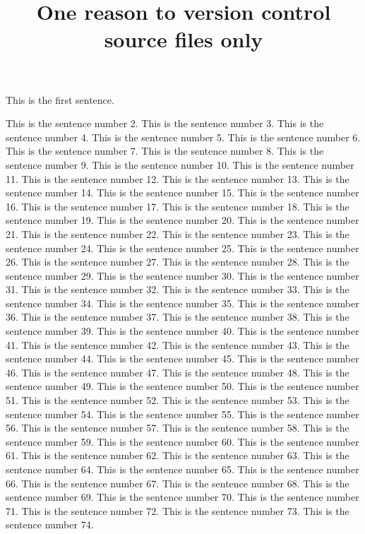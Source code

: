 \documentclass{article}
\title{One reason to version control source files only}
\begin{document}
\maketitle

This is the first sentence.

This is the sentence number 2.
This is the sentence number 3.
This is the sentence number 4.
This is the sentence number 5.
This is the sentence number 6.
This is the sentence number 7.
This is the sentence number 8.
This is the sentence number 9.
This is the sentence number 10.
This is the sentence number 11.
This is the sentence number 12.
This is the sentence number 13.
This is the sentence number 14.
This is the sentence number 15.
This is the sentence number 16.
This is the sentence number 17.
This is the sentence number 18.
This is the sentence number 19.
This is the sentence number 20.
This is the sentence number 21.
This is the sentence number 22.
This is the sentence number 23.
This is the sentence number 24.
This is the sentence number 25.
This is the sentence number 26.
This is the sentence number 27.
This is the sentence number 28.
This is the sentence number 29.
This is the sentence number 30.
This is the sentence number 31.
This is the sentence number 32.
This is the sentence number 33.
This is the sentence number 34.
This is the sentence number 35.
This is the sentence number 36.
This is the sentence number 37.
This is the sentence number 38.
This is the sentence number 39.
This is the sentence number 40.
This is the sentence number 41.
This is the sentence number 42.
This is the sentence number 43.
This is the sentence number 44.
This is the sentence number 45.
This is the sentence number 46.
This is the sentence number 47.
This is the sentence number 48.
This is the sentence number 49.
This is the sentence number 50.
This is the sentence number 51.
This is the sentence number 52.
This is the sentence number 53.
This is the sentence number 54.
This is the sentence number 55.
This is the sentence number 56.
This is the sentence number 57.
This is the sentence number 58.
This is the sentence number 59.
This is the sentence number 60.
This is the sentence number 61.
This is the sentence number 62.
This is the sentence number 63.
This is the sentence number 64.
This is the sentence number 65.
This is the sentence number 66.
This is the sentence number 67.
This is the sentence number 68.
This is the sentence number 69.
This is the sentence number 70.
This is the sentence number 71.
This is the sentence number 72.
This is the sentence number 73.
This is the sentence number 74.
\end{document}
